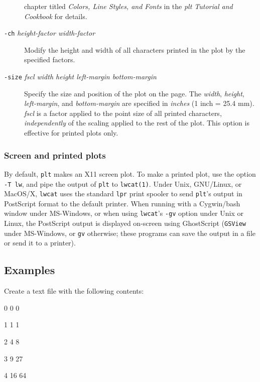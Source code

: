 \begin{description}
chapter titled \textit{Colors, Line Styles, and Fonts} in the \textit{plt Tutorial and Cookbook}
for details. 
\item [\texttt{-ch}\textit{ height-factor width-factor} ] Modify the height and width of
all characters printed in the plot by the specified factors. 
\item [\texttt{-size}\textit{ fscl width
height left-margin bottom-margin} ] Specify the size and position of the plot
on the page.  The \textit{width}, \textit{height}, \textit{left-margin}, and \textit{bottom-margin} are specified
in \textit{inches} (1 inch = 25.4 mm).  \textit{fscl} is a factor applied to the point size
of all printed characters, \textit{independently} of the scaling applied to the
rest of the plot.  This option is effective for printed plots only. 
\end{description}

\subsubsection*{Screen
and printed plots}

By default, \texttt{plt} makes an X11 screen plot.  To make a printed
plot, use the option \texttt{-T lw}, and pipe the output of \texttt{plt} to \texttt{\textsf{lwcat}(1)}.  Under
Unix, GNU/Linux, or MacOS/X, \texttt{lwcat} uses the standard \texttt{lpr} print spooler
to send \texttt{plt}'s output in PostScript format to the default printer.  When running
with a Cygwin/bash window under MS-Windows, or when using \texttt{lwcat}'s \texttt{-gv} option
under Unix or Linux, the PostScript output is displayed on-screen using
GhostScript (\texttt{GSView} under MS-Windows, or \texttt{gv} otherwise; these programs can
save the output in a file or send it to a printer). 
\subsection*{Examples}


Create a text
file with the following contents: 

	0  0  0

 

	1  1  1

 

	2  4  8

 

	3  9 27

 

	4 16 64

 

